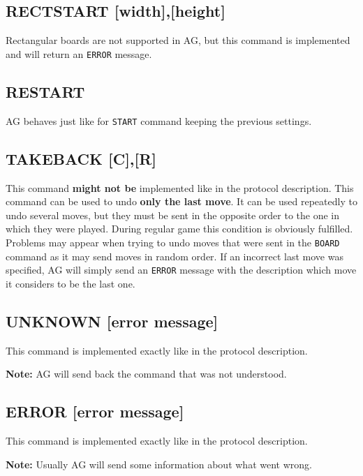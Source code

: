 \documentclass[12pt,a4paper]{article}
\begin{document}
\subsection{RECTSTART [width],[height]}
\label{cmd_rectstart}
Rectangular boards are not supported in AG, but this command is implemented and will return an \texttt{ERROR} message.


\subsection{RESTART}
\label{cmd_restart}
AG behaves just like for \texttt{START} command keeping the previous settings.


\subsection{TAKEBACK [C],[R]}
\label{cmd_takeback}
This command \textbf{might not be} implemented like in the protocol description. This command can be used to undo \textbf{only the last move}. It can be used repeatedly to undo several moves, but they must be sent in the opposite order to the one in which they were played. During regular game this condition is obviously fulfilled. Problems may appear when trying to undo moves that were sent in the \texttt{BOARD} command as it may send moves in random order. If an incorrect last move was specified, AG will simply send an \texttt{ERROR} message with the description which move it considers to be the last one.


\subsection{UNKNOWN [error message]}
\label{cmd_unknown}
This command is implemented exactly like in the protocol description. 

\textbf{Note:} AG will send back the command that was not understood.


\subsection{ERROR [error message]}
\label{cmd_error}
This command is implemented exactly like in the protocol description.

\textbf{Note:} Usually AG will send some information about what went wrong.
\end{document}
